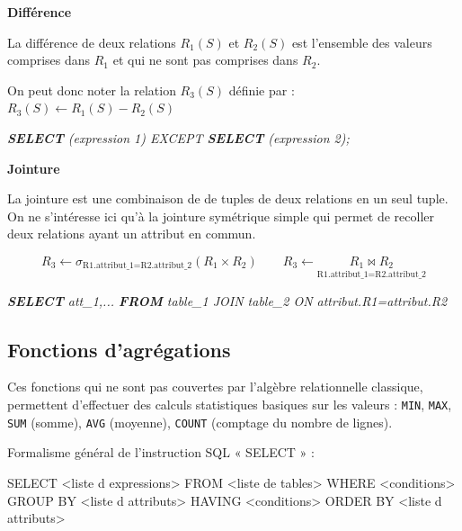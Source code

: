 \documentclass[10pt,fleqn]{article} %
\begin{document}
\begin{defi}

\textbf{Différence}

La différence de deux relations $R_1(S)$ et $R_2(S)$ est l'ensemble des valeurs comprises dans $R_1$ et qui ne sont pas comprises dans $R_2$. 

On peut donc noter la relation $R_3(S)$ définie par : $R_3(S)\leftarrow R_1(S)-R_2(S)$

\textsl{\textbf{SELECT}  (expression 1) EXCEPT \textbf{SELECT} (expression 2);}

\end{defi}


\begin{defi}

\textbf{Jointure}

La jointure est une combinaison de de tuples de deux relations en un seul tuple. On ne s'intéresse ici qu'à la jointure symétrique simple qui permet de recoller deux relations ayant un attribut en commun. 

$$ 
R_3 \leftarrow \sigma_{\text{R1.attribut\_1=R2.attribut\_2}} (R_1\times R_2) \quad \quad 
R_3 \leftarrow \underset{\text{R1.attribut\_1=R2.attribut\_2}}{R_1 \bowtie R_2}
$$

\textsl{\textbf{SELECT} att\_1,... \textbf{FROM} table\_1 JOIN table\_2 ON attribut.R1=attribut.R2}
\end{defi}




\subsection*{Fonctions d'agrégations}
\begin{defi}
Ces fonctions qui ne sont pas couvertes par l’algèbre relationnelle 
classique, permettent d’effectuer des calculs statistiques basiques sur les valeurs : \texttt{MIN}, \texttt{MAX}, \texttt{SUM} 
(somme), \texttt{AVG} (moyenne), \texttt{COUNT} (comptage du nombre de lignes). 
\end{defi}

Formalisme général de l’instruction SQL « SELECT » :
\begin{envsql}
\begin{sql}
SELECT <liste d expressions> 
    FROM <liste de tables> 
    WHERE <conditions> 
    GROUP BY <liste d attributs> 
    HAVING <conditions> 
    ORDER BY <liste d attributs> 
\end{sql}
\end{envsql}
\end{document}
